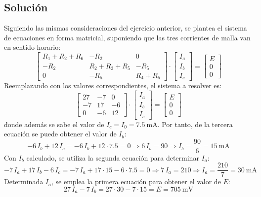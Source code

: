 \subsection*{Solución}
Siguiendo las mismas consideraciones del ejercicio anterior, se plantea el sistema de ecuaciones en forma matricial, suponiendo que
las tres corrientes de malla van en sentido horario:
\begin{equation*}
  \begin{bmatrix}
    R_1+R_2+R_6 & -R_2 & 0 \\
    -R_2 & R_2+R_3+R_5 & -R_5 \\
    0 & -R_5 & R_4+R_5
  \end{bmatrix} \cdot
  \begin{bmatrix}
    I_a\\
    I_b\\
    I_c
  \end{bmatrix} = %
  \begin{bmatrix}
    E \\
    0\\
    0
  \end{bmatrix}
\end{equation*}
Reemplazando con los valores correspondientes, el sistema a resolver es:
\begin{equation*}
  \begin{bmatrix}
    27 & -7 & 0 \\
    -7 & 17 & -6 \\
    0 & -6 & 12
  \end{bmatrix} \cdot
  \begin{bmatrix}
    I_a\\
    I_b\\
    I_c
  \end{bmatrix} = %
  \begin{bmatrix}
    E \\
    0\\
    0
  \end{bmatrix}
\end{equation*}
donde además se sabe el valor de $I_c=I_0=\qty{7.5}{\milli\ampere}$. Por
tanto, de la tercera ecuación se puede obtener el valor de $I_b$:
\begin{equation*}
  -6\,I_b+12\,I_c=-6\,I_b+12\cdot 7.5 = 0\Rightarrow 6\,I_b=90 \Rightarrow I_b=\dfrac{90}{6}=\qty{15}{\milli\ampere}
\end{equation*}
Con $I_b$ calculado, se utiliza la segunda ecuación para determinar
$I_a$:
\begin{equation*}
  -7\,I_a+17\,I_b-6\,I_c=-7\,I_a+17\cdot 15-6\cdot 7.5 = 0\Rightarrow 7\,I_a=210\Rightarrow I_a=\dfrac{210}{7}=\qty{30}{\milli\ampere}
\end{equation*}
Determinada $I_a$, se emplea la primera ecuación para obtener el valor
de $E$:
\begin{equation*}
  27\,I_a-7\,I_b=27\cdot 30 - 7 \cdot 15 = E = {\qty{705}{\milli\volt}}
\end{equation*}


